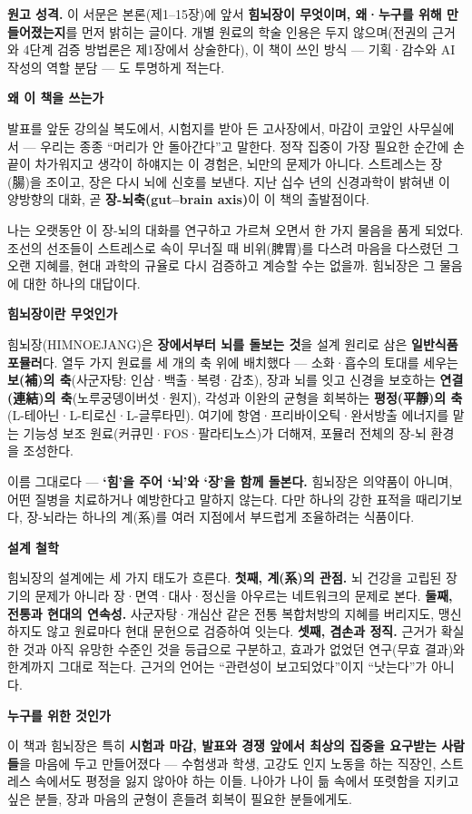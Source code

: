 \documentclass[11pt]{article}
\newcommand{\gothic}{\sffamily}
\newcommand{\pfsec}[1]{%
  \par\vspace{2.4mm}%
  {\gothic\large\bfseries\color{celadondk}#1}\par\vspace{-0.4mm}}
\newcommand{\prefnote}[1]{%
  \par\vspace{1mm}\noindent
  \colorbox{paper}{%
    \begin{minipage}{\dimexpr\linewidth-2\fboxsep\relax}%
      \small\color{ink}#1%
    \end{minipage}}\par\vspace{1.6mm}}
\begin{document}
\prefnote{\textbf{원고 성격.} 이 서문은 본론(제1{–}15장)에 앞서 \textbf{힘뇌장이 무엇이며, 왜·누구를 위해 만들어졌는지}를 먼저 밝히는 글이다. 개별 원료의 학술 인용은 두지 않으며(전권의 근거와 4단계 검증 방법론은 제1장에서 상술한다), 이 책이 쓰인 방식 — 기획·감수와 AI 작성의 역할 분담 — 도 투명하게 적는다.}

\pfsec{왜 이 책을 쓰는가}
발표를 앞둔 강의실 복도에서, 시험지를 받아 든 고사장에서, 마감이 코앞인 사무실에서 — 우리는 종종 “머리가 안 돌아간다”고 말한다. 정작 집중이 가장 필요한 순간에 손끝이 차가워지고 생각이 하얘지는 이 경험은, 뇌만의 문제가 아니다. 스트레스는 장(腸)을 조이고, 장은 다시 뇌에 신호를 보낸다. 지난 십수 년의 신경과학이 밝혀낸 이 양방향의 대화, 곧 \textbf{장-뇌축(gut–brain axis)}이 이 책의 출발점이다.

나는 오랫동안 이 장-뇌의 대화를 연구하고 가르쳐 오면서 한 가지 물음을 품게 되었다. 조선의 선조들이 스트레스로 속이 무너질 때 비위(脾胃)를 다스려 마음을 다스렸던 그 오랜 지혜를, 현대 과학의 규율로 다시 검증하고 계승할 수는 없을까. 힘뇌장은 그 물음에 대한 하나의 대답이다.

\pfsec{힘뇌장이란 무엇인가}
힘뇌장(HIMNOEJANG)은 \textbf{장에서부터 뇌를 돌보는 것}을 설계 원리로 삼은 \textbf{일반식품 포뮬러}다. 열두 가지 원료를 세 개의 축 위에 배치했다 — 소화·흡수의 토대를 세우는 \textbf{보(補)의 축}(사군자탕: 인삼·백출·복령·감초), 장과 뇌를 잇고 신경을 보호하는 \textbf{연결(連結)의 축}(노루궁뎅이버섯·원지), 각성과 이완의 균형을 회복하는 \textbf{평정(平靜)의 축}(L-테아닌·L-티로신·L-글루타민). 여기에 항염·프리바이오틱·완서방출 에너지를 맡는 기능성 보조 원료(커큐민·FOS·팔라티노스)가 더해져, 포뮬러 전체의 장-뇌 환경을 조성한다.

이름 그대로다 — \textbf{‘힘’을 주어 ‘뇌’와 ‘장’을 함께 돌본다.} 힘뇌장은 의약품이 아니며, 어떤 질병을 치료하거나 예방한다고 말하지 않는다. 다만 하나의 강한 표적을 때리기보다, 장-뇌라는 하나의 계(系)를 여러 지점에서 부드럽게 조율하려는 식품이다.

\pfsec{설계 철학}
힘뇌장의 설계에는 세 가지 태도가 흐른다. \textbf{첫째, 계(系)의 관점.} 뇌 건강을 고립된 장기의 문제가 아니라 장·면역·대사·정신을 아우르는 네트워크의 문제로 본다. \textbf{둘째, 전통과 현대의 연속성.} 사군자탕·개심산 같은 전통 복합처방의 지혜를 버리지도, 맹신하지도 않고 원료마다 현대 문헌으로 검증하여 잇는다. \textbf{셋째, 겸손과 정직.} 근거가 확실한 것과 아직 유망한 수준인 것을 등급으로 구분하고, 효과가 없었던 연구(무효 결과)와 한계까지 그대로 적는다. 근거의 언어는 “관련성이 보고되었다”이지 “낫는다”가 아니다.

\pfsec{누구를 위한 것인가}
이 책과 힘뇌장은 특히 \textbf{시험과 마감, 발표와 경쟁 앞에서 최상의 집중을 요구받는 사람들}을 마음에 두고 만들어졌다 — 수험생과 학생, 고강도 인지 노동을 하는 직장인, 스트레스 속에서도 평정을 잃지 않아야 하는 이들. 나아가 나이 듦 속에서 또렷함을 지키고 싶은 분들, 장과 마음의 균형이 흔들려 회복이 필요한 분들에게도.
\end{document}
